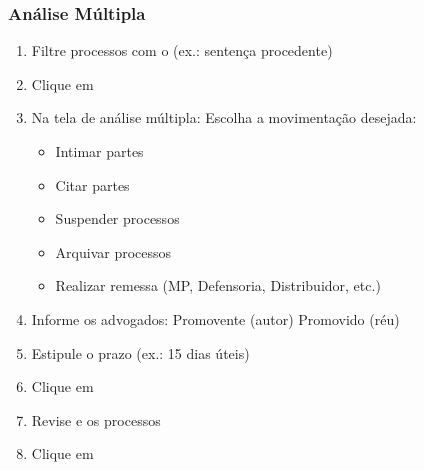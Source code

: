 \documentclass[letterpaper,10pt,brazil]{sphinxmanual}
\begin{document}
\subsubsection{Análise Múltipla}
\label{\detokenize{projud_07_analisejuntada_multiplaeunitariaconclusos:analise-multipla}}\begin{enumerate}
%
\item {} 
\sphinxAtStartPar
Filtre processos com o  (ex.: sentença procedente)

\item {} 
\sphinxAtStartPar
Clique em 

\item {} 
\sphinxAtStartPar
Na tela de análise múltipla:
\sphinxhyphen{} Escolha a movimentação desejada:
\begin{itemize}
\item {} 
\sphinxAtStartPar
Intimar partes

\item {} 
\sphinxAtStartPar
Citar partes

\item {} 
\sphinxAtStartPar
Suspender processos

\item {} 
\sphinxAtStartPar
Arquivar processos

\item {} 
\sphinxAtStartPar
Realizar remessa (MP, Defensoria, Distribuidor, etc.)

\end{itemize}

\item {} 
\sphinxAtStartPar
Informe os advogados:
\sphinxhyphen{} Promovente (autor)
\sphinxhyphen{} Promovido (réu)

\item {} 
\sphinxAtStartPar
Estipule o prazo (ex.: 15 dias úteis)

\item {} 
\sphinxAtStartPar
Clique em 

\item {} 
\sphinxAtStartPar
Revise e  os processos

\item {} 
\sphinxAtStartPar
Clique em 

\end{enumerate}
\end{document}
